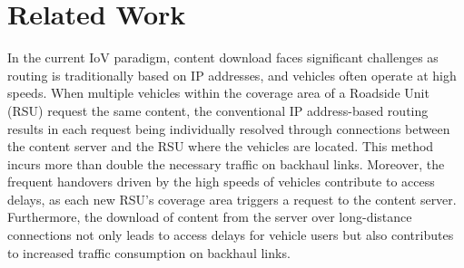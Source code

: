 \documentclass[journal]{IEEEtran}
\begin{document}
\section{Related Work} \label{sec.rw}
In the current IoV paradigm, content download faces significant challenges as routing is traditionally based on IP addresses, and vehicles often operate at high speeds.
When multiple vehicles within the coverage area of a Roadside Unit (RSU) request the same content, the conventional IP address-based routing results in each request being individually resolved through connections between the content server and the RSU where the vehicles are located.
This method incurs more than double the necessary traffic on backhaul links.
Moreover, the frequent handovers driven by the high speeds of vehicles contribute to access delays, as each new RSU's coverage area triggers a request to the content server.
Furthermore, the download of content from the server over long-distance connections not only leads to access delays for vehicle users but also contributes to increased traffic consumption on backhaul links.
\end{document}
